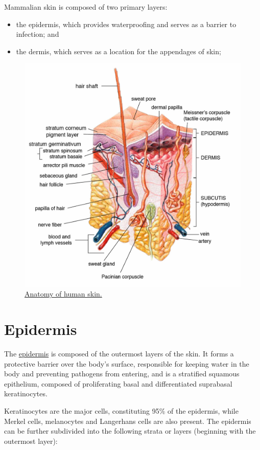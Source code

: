 Mammalian skin is composed of two primary layers:

\begin{itemize}
\tightlist
\item
  the epidermis, which provides waterproofing and serves as a barrier to
  infection; and
\item
  the dermis, which serves as a location for the appendages of skin;
\end{itemize}

\begin{figure}

{\centering \includegraphics[width=0.7\linewidth]{./figures/anatomy/skin}

}

\caption{\href{https://commons.wikimedia.org/wiki/File:Skin.png}{Anatomy of human
skin.}}\label{fig:skin}
\end{figure}

\section{Epidermis}\label{epidermis}

The \href{https://en.wikipedia.org/wiki/Epidermis}{epidermis} is
composed of the outermost layers of the skin. It forms a protective
barrier over the body's surface, responsible for keeping water in the
body and preventing pathogens from entering, and is a stratified
squamous epithelium, composed of proliferating basal and differentiated
suprabasal keratinocytes.

Keratinocytes are the major cells, constituting 95\% of the epidermis,
while Merkel cells, melanocytes and Langerhans cells are also present.
The epidermis can be further subdivided into the following strata or
layers (beginning with the outermost layer):

